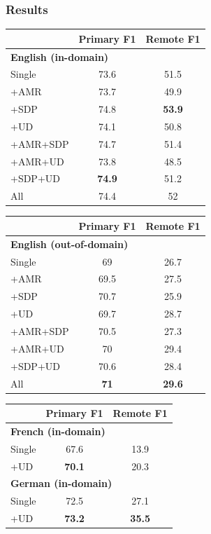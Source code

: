 \documentclass[t,xcolor={svgnames}]{beamer}
\begin{document}
\begin{frame}
\frametitle{Results}
\centering
\small
\setlength\tabcolsep{3pt}
\begin{tabular}{lcc}
& \footnotesize \bf Primary F1 & \footnotesize \bf Remote F1 \\
\hline
\multicolumn{3}{l}{\small \bf English (in-domain)} \\
\footnotesize Single
& 73.6 & 51.5 \\
\cline{1-1}
\footnotesize +AMR
& 73.7 & 49.9 \\
\footnotesize +SDP
& 74.8 & \textbf{53.9} \\
\footnotesize +UD
& 74.1 & 50.8 \\
\footnotesize +AMR+SDP
& 74.7 & 51.4 \\
\footnotesize +AMR+UD
& 73.8 & 48.5 \\
\footnotesize +SDP+UD
& \textbf{74.9} & 51.2 \\
\footnotesize All
& 74.4 & 52
\end{tabular}
\hfill
\begin{tabular}{lcc}
& \footnotesize \bf Primary F1 & \footnotesize \bf Remote F1 \\
\hline
\multicolumn{3}{l}{\small \bf English (out-of-domain)} \\
\footnotesize Single
& 69 & 26.7 \\
\cline{1-1}
\footnotesize +AMR
& 69.5 & 27.5 \\
\footnotesize +SDP
& 70.7 & 25.9 \\
\footnotesize +UD
& 69.7 & 28.7 \\
\footnotesize +AMR+SDP
& 70.5 & 27.3 \\
\footnotesize +AMR+UD
& 70 & 29.4 \\
\footnotesize +SDP+UD
& 70.6 & 28.4 \\
\footnotesize All
& \textbf{71} & \textbf{29.6}
\end{tabular}
\vfill
\begin{tabular}{lcc}
& \footnotesize \bf Primary F1 & \footnotesize \bf Remote F1 \\
\hline
\multicolumn{3}{l}{\small \bf French (in-domain)} \\
\small Single & 67.6 & 13.9 \\
\small +UD & \textbf{70.1} & 20.3 \\
\hline
\multicolumn{3}{l}{\small \bf German (in-domain)} \\
\small Single & 72.5 & 27.1 \\
\small +UD & \textbf{73.2} & \textbf{35.5}
\end{tabular}
\end{frame}
\end{document}
